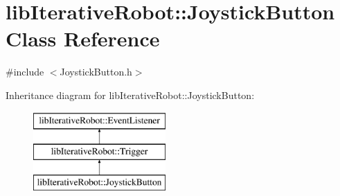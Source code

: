 \hypertarget{classlib_iterative_robot_1_1_joystick_button}{}\section{lib\+Iterative\+Robot\+::Joystick\+Button Class Reference}
\label{classlib_iterative_robot_1_1_joystick_button}


{\ttfamily \#include $<$Joystick\+Button.\+h$>$}

Inheritance diagram for lib\+Iterative\+Robot\+::Joystick\+Button\+:\begin{figure}[H]
\begin{center}
\leavevmode
\includegraphics[height=3.000000cm]{classlib_iterative_robot_1_1_joystick_button}
\end{center}
\end{figure}
